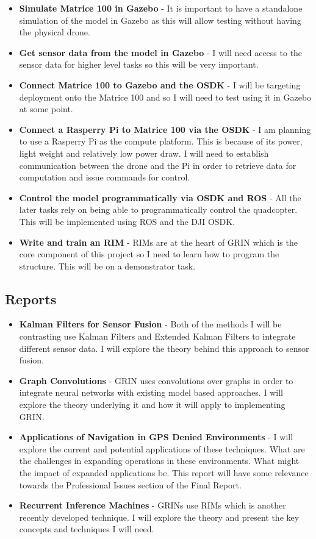 \documentclass[]{../resources/final_report}
\begin{document}
\begin{itemize}
  \item \textbf{Simulate Matrice 100 in Gazebo} - It is important to have a standalone simulation of the model in Gazebo as this will allow testing without having the physical drone.
  \item \textbf{Get sensor data from the model in Gazebo} - I will need access to the sensor data for higher level tasks so this will be very important.
  \item \textbf{Connect Matrice 100 to Gazebo and the OSDK} - I will be targeting deployment onto the Matrice 100 and so I will need to test using it in Gazebo at some point.
  \item \textbf{Connect a Rasperry Pi to Matrice 100 via the OSDK} - I am planning to use a Rasperry Pi as the compute platform. This is because of its power, light weight and relatively low power draw. I will need to establish communication between the drone and the Pi in order to retrieve data for computation and issue commands for control.
  \item \textbf{Control the model programmatically via OSDK and ROS} - All the later tasks rely on being able to programmatically control the quadcopter. This will be implemented using ROS and the DJI OSDK.
  \item \textbf{Write and train an RIM} - RIMs are at the heart of GRIN which is the core component of this project so I need to learn how to program the structure. This will be on a demonstrator task.
\end{itemize}

\subsection{Reports}
\begin{itemize}
  \item \textbf{Kalman Filters for Sensor Fusion} - Both of the methods I will be contrasting use Kalman Filters and Extended Kalman Filters to integrate different sensor data. I will explore the theory behind this approach to sensor fusion.
  \item \textbf{Graph Convolutions} - GRIN uses convolutions over graphs in order to integrate neural networks with existing model based approaches. I will explore the theory underlying it and how it will apply to implementing GRIN.
  \item \textbf{Applications of Navigation in GPS Denied Environments} - I will explore the current and potential applications of these techniques. What are the challenges in expanding operations in these environments. What might the impact of expanded applications be. This report will have some relevance towards the Professional Issues section of the Final Report.
  \item \textbf{Recurrent Inference Machines} - GRINs use RIMs which is another recently developed technique. I will explore the theory and present the key concepts and techniques I will need.
\end{itemize}
\end{document}
